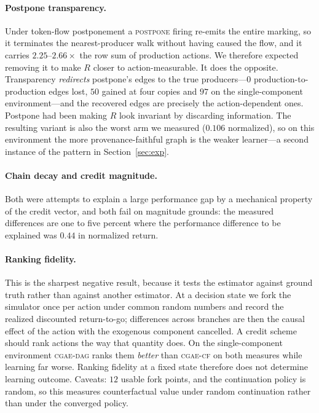 \documentclass[review,authoryear,3p,times]{elsarticle}
\newcommand{\cflow}{\textsc{cgae-cf}}          %
\newcommand{\cdag}{\textsc{cgae-dag}}          %
\begin{document}
\paragraph{Postpone transparency.}
Under token-flow postponement a \textsc{postpone} firing re-emits the entire
marking, so it terminates the nearest-producer walk without having caused the
flow, and it carries $2.25$--$2.66\times$ the row sum of production actions. We
therefore expected removing it to make $R$ closer to action-measurable. It does
the opposite. Transparency \emph{redirects} postpone's edges to the true
producers---$0$ production-to-production edges lost, $50$ gained at four copies
and $97$ on the single-component environment---and the recovered edges are
precisely the action-dependent ones. Postpone had been making $R$ look invariant
by discarding information. The resulting variant is also the worst arm we
measured ($0.106$ normalized), so on this environment the more
provenance-faithful graph is the weaker learner---a second instance of the
pattern in Section~\ref{sec:exp}.

\paragraph{Chain decay and credit magnitude.}
Both were attempts to explain a large performance gap by a mechanical property
of the credit vector, and both fail on magnitude grounds: the measured
differences are one to five percent where the performance difference to be
explained was $0.44$ in normalized return.

\paragraph{Ranking fidelity.}
This is the sharpest negative result, because it tests the estimator against
ground truth rather than against another estimator. At a decision state we fork
the simulator once per action under common random numbers and record the
realized discounted return-to-go; differences across branches are then the
causal effect of the action with the exogenous component cancelled. A credit
scheme should rank actions the way that quantity does. On the single-component
environment \cdag{} ranks them \emph{better} than \cflow{} on both measures
while learning far worse. Ranking fidelity at a fixed state therefore does not
determine learning outcome. Caveats: $12$ usable fork points, and the
continuation policy is random, so this measures counterfactual value under
random continuation rather than under the converged policy.
\end{document}
